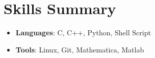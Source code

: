 \documentclass[letterpaper,10pt]{article}
\newcommand{\resumeItem}[2]{
  \item\small{
    \textbf{#1}{: #2 \vspace{-2pt}}
  }
}
\newcommand{\resumeSubItem}[2]{\resumeItem{#1}{#2}\vspace{-4pt}}
\newcommand{\resumeSubHeadingListStart}{\begin{itemize}[leftmargin=*]}
\newcommand{\resumeSubHeadingListEnd}{\end{itemize}}
\begin{document}
\section{Skills Summary}
	\resumeSubHeadingListStart
	\resumeSubItem{Languages}{C, C++, Python, Shell Script}
	\resumeSubItem{Tools}{Linux, Git, Mathematica, Matlab}
\resumeSubHeadingListEnd
\end{document}

